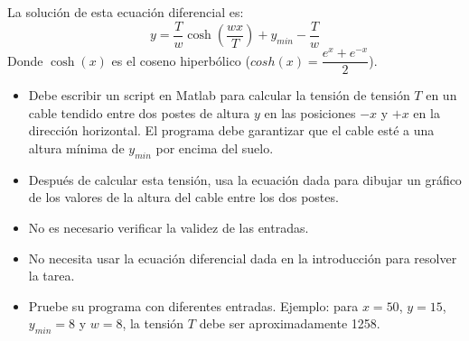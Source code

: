 \documentclass[12pt,letterpaper]{article}
\begin{document}
\begin{enumerate}
La soluci\'on de esta ecuaci\'on diferencial es:
$$
y = \dfrac{T}{w}\cosh\left(\dfrac{wx}{T}\right) + y_{min}-\dfrac{T}{w}
$$
Donde $\cosh(x)$ es el coseno hiperb\'olico ($cosh(x) = \dfrac{e^x + e^{-x}}{2}$).
\begin{itemize}
    \item Debe escribir un script en Matlab para calcular la tensi\'on de tensi\'on 
    $T$ en un cable tendido entre dos postes de altura 
    $y$ en las posiciones $-x$ y $+x$ en la dirección horizontal. El programa debe garantizar que el cable est\'e a una altura m\'inima de 
    $y_{min}$ por encima del suelo.
    \item Despu\'es de calcular esta tensi\'on, usa la ecuaci\'on dada para dibujar un gr\'afico de los valores de la altura del cable entre los dos postes.
    \item No es necesario verificar la validez de las entradas.
    \item No necesita usar la ecuaci\'on diferencial dada en la introducci\'on para resolver la tarea.
    \item Pruebe su programa con diferentes entradas. Ejemplo: para $x=50$, $y=15$, $y_{min}=8$ y 
    $w=8$, la tensi\'on $T$ debe ser aproximadamente 1258.
\end{itemize}
\end{enumerate}
\end{document}
